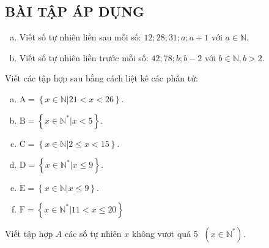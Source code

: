 \subsection{BÀI TẬP ÁP DỤNG}
\begin{bt}  
\begin{enumerate}[a)]
\item Viết số tự nhiên liền sau mỗi số: $12; 28; 31; a; a+1$ với $a \in \mathbb{N}$.
\item Viết số tự nhiên liền trước mỗi số: $42; 78; b; b-2$ với $b\in \mathbb{N}, b > 2$.
\end{enumerate}
\end{bt}  \begin{bt}
Viết các tập hợp sau bằng cách liệt kê các phần tử:
\begin{enumerate}[a)]
\item $\mathrm{A}=\left\{ x\in \mathbb{N}|21<x<26 \right\}$.
\item $\mathrm{B}=\left\{ x\in {{\mathbb{N}}^{*}}|x<5 \right\}$.
\item $\mathrm{C}=\left\{ x\in \mathbb{N}|2\le x<15 \right\}$.
\item $\mathrm{D}=\left\{ x\in {{\mathbb{N}}^{*}}|x\le 9 \right\}$.
\item $\mathrm{E} = \left\{ x \in \mathbb{N} |x \leq 9 \right\}$.
\item $\mathrm{F} = \left\{ x \in \mathbb{N^*}| 11<x\leq 20 \right\}$
\end{enumerate}
\end{bt}  \begin{bt} 
Viết tập hợp $A$ các số tự nhiên $x$ không vượt quá 5 $\;\left( {x \in \mathbb{N}^*} \right)$.

\end{bt}
